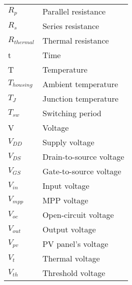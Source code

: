 \begin{tabular}{ll}
$R_{p}$ & Parallel resistance \\
$R_{s}$ & Series resistance \\
$R_{thermal}$ & Thermal resistance\\
t & Time\\
T & Temperature \\
$T_{housing}$ & Ambient temperature \\
$T_{J}$ & Junction temperature \\
$T_{sw}$ & Switching period \\
V & Voltage\\
$V_{DD}$ & Supply voltage\\
$V_{DS}$ & Drain-to-source voltage\\
$V_{GS}$ & Gate-to-source voltage\\
$V_{in}$ & Input voltage \\
$V_{mpp}$ & MPP voltage\\
$V_{oc}$ & Open-circuit voltage\\
$V_{out}$ & Output voltage \\
$V_{pv}$ & PV panel's voltage \\
$V_{t}$ & Thermal voltage \\
$V_{th}$ & Threshold voltage \\
\end{tabular}
